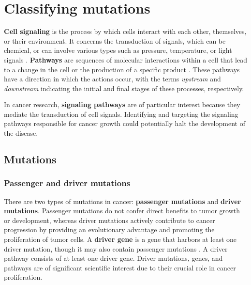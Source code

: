 \chapter{Classifying mutations} \label{chap:classifying_mutations}

\textbf{Cell signaling} is the process by which cells interact with each other, themselves, or their environment. It concerns the transduction of signals, which can be chemical, or can involve various types such as pressure, temperature, or light signals \cite{cell_signaling}. \textbf{Pathways} are sequences of molecular interactions within a cell that lead to a change in the cell or the production of a specific product \cite{pathway}. These pathways have a direction in which the actions occur, with the terms \textit{upstream} and \textit{downstream} indicating the initial and final stages of these processes, respectively.

In cancer research, \textbf{signaling pathways} are of particular interest because they mediate the transduction of cell signals. Identifying and targeting the signaling pathways responsible for cancer growth could potentially halt the development of the disease. 

\section{Mutations}

\subsection{Passenger and driver mutations}

There are two types of mutations in cancer: \textbf{passenger mutations} and \textbf{driver mutations}. Passenger mutations do not confer direct benefits to tumor growth or development, whereas driver mutations actively contribute to cancer progression by providing an evolutionary advantage and promoting the proliferation of tumor cells. A \textbf{driver gene} is a gene that harbors at least one driver mutation, though it may also contain passenger mutations . A driver pathway consists of at least one driver gene. Driver mutations, genes, and pathways are of significant scientific interest due to their crucial role in cancer proliferation.

